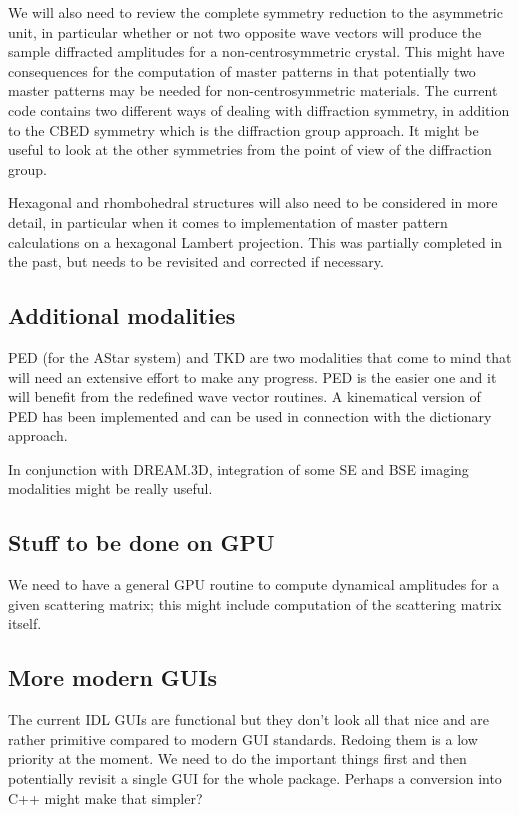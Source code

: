 \documentclass[DIV=calc, paper=letter, fontsize=11pt]{scrartcl}	 %
\begin{document}
We will also need to review the complete symmetry reduction to the asymmetric unit, in particular whether or not two opposite wave vectors 
will produce the sample diffracted amplitudes for a non-centrosymmetric crystal.  This might have consequences for the computation
of master patterns in that potentially two master patterns may be needed for non-centrosymmetric materials.  The current code
contains two different ways of dealing with diffraction symmetry, in addition to the CBED symmetry which is the 
diffraction group approach.  It might be useful to look at the other symmetries from the point of view of the diffraction group.

Hexagonal and rhombohedral structures will also need to be considered in more detail, in particular when it comes to 
implementation of master pattern calculations on a hexagonal Lambert projection.  This was partially completed 
in the past, but needs to be revisited and corrected if necessary.

\subsection{Additional modalities}
PED (for the AStar system) and TKD are two modalities that come to mind that will need an extensive effort to 
make any progress.  PED is the easier one and it will benefit from the redefined wave vector routines.  A kinematical
version of PED has been implemented and can be used in connection with the dictionary approach.

In conjunction with DREAM.3D, integration of some SE and BSE imaging modalities might be really useful.



\subsection{Stuff to be done on GPU}
We need to have a general GPU routine to compute dynamical amplitudes for a given scattering matrix;
this might include computation of the scattering matrix itself.

\subsection{More modern GUIs}
The current IDL GUIs are functional but they don't look all that nice and are rather primitive compared to modern GUI standards.
Redoing them is a low priority at the moment.   We need to do the important things first and then potentially revisit a single GUI for
the whole package.  Perhaps a conversion into C++ might make that simpler?
\end{document}
